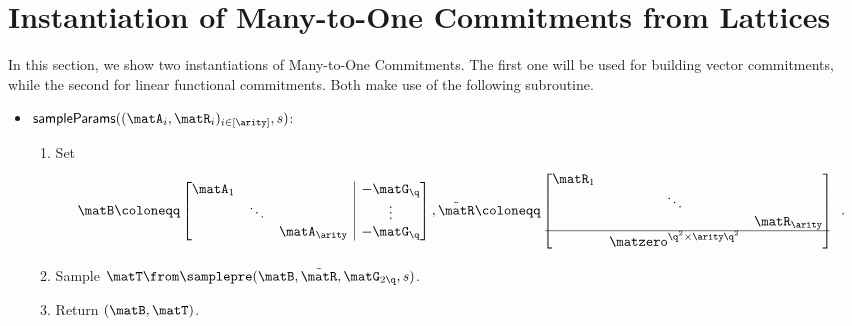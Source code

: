 	\section{Instantiation of Many-to-One Commitments from Lattices}\label{sec:lattice-instantiation}
	In this section, we show two instantiations of Many-to-One Commitments.
	The first one will be used for building vector commitments, while the second for linear functional commitments.
  Both make use of the following subroutine.
  \newcommand{\sampleParams}{\mathsf{sampleParams}}
  \begin{construction}
    \begin{itemize}[noitemsep]
      \item[] $\sampleParams((\matA_i, \matR_i)_{i \in [\arity]}, s)$:
        \begin{enumerate}[nolistsep]
          \item Set \begin{equation*} 
					\matB \coloneqq 
					\left[\begin{array}{@{}ccc|c@{}}
						\matA_1 &        & & -\matG_\q \\ 
						& \ddots & & \vdots \\ 
						& & \matA_\arity & -\matG_\q
					\end{array}\right], 
					\tilde{\matR} \coloneqq
					\begin{bmatrix}
						\matR_{1} & & \\
						& \ddots & \\
						& & \matR_{\arity} \\
						\hline 
						& \matzero^{\q^2 \times \arity \q^2} &
					\end{bmatrix}
					\enspace .
				\end{equation*}
				\item Sample $\matT \from \samplepre(\matB, \tilde{\matR}, \matG_{2\q}, s)$.
        \item Return $(\matB, \matT)$.
        \end{enumerate}
    \end{itemize}
  \end{construction}
	
